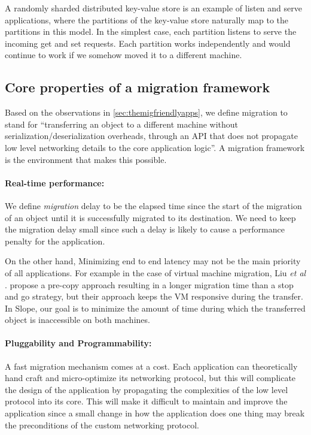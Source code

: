 A randomly sharded distributed key-value store is
an example of listen and serve applications, where the
partitions of the key-value store naturally map to the partitions in this
model. In the simplest case, each partition listens to serve the incoming
get and set requests. Each partition works independently and would continue to
work if we somehow moved it to a different machine.


\subsection{Core properties of a migration framework}
\label{subsec:coreprops}
Based on the observations in \autoref{sec:themigfriendlyapps}, we define
migration to stand for ``transferring an object to a
different machine without serialization/deserialization overheads, through an API that does not
propagate low level networking details to the core application logic''.
A
migration framework is the environment that makes this possible.

\paragraph{Real-time performance:}
We define \emph{migration} delay to be the elapsed time since the start of the
migration of an object until it is successfully migrated to its
destination. We need to keep the migration delay small since such a delay
is likely to cause a performance penalty for the application.

On the other hand, Minimizing end to end latency may not be the main priority of all applications.
For example in the case of virtual machine migration, Liu \textit{et al}$.$ \cite{vmliu}
propose a pre-copy approach resulting in a longer migration time than a stop
and go strategy, but their approach keeps the VM responsive during the transfer.
In Slope, our goal is to minimize the amount of time during which the
transferred object is inaccessible on both machines.

\paragraph{Pluggability and Programmability:}
A fast migration mechanism comes at a cost. Each application
can theoretically hand craft and micro-optimize its networking protocol,
but this will complicate the design of the application by propagating
the complexities of the low level protocol into its core.
This will make it difficult to maintain and improve the
application since a small change in how the application does one thing
may break the preconditions of the custom networking protocol.

